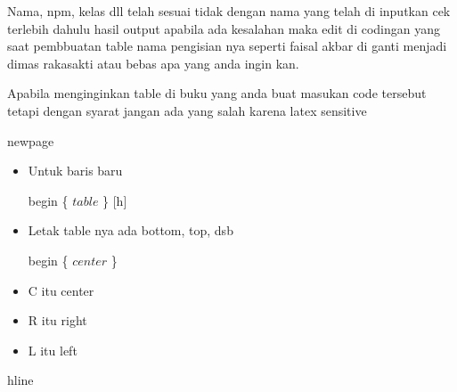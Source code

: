 Nama, npm, kelas dll telah sesuai tidak dengan nama yang telah di inputkan cek terlebih dahulu hasil output apabila ada kesalahan maka edit di codingan yang saat pembbuatan table nama pengisian nya seperti faisal akbar di ganti menjadi dimas rakasakti atau bebas apa yang anda ingin kan.\par


 Apabila menginginkan table di buku yang anda buat masukan code tersebut tetapi dengan syarat jangan ada yang salah karena latex sensitive\par


\noindent newpage\par

\begin{itemize}
	\item Untuk baris baru\par

begin \{ $table$ \} [h]\par

	\item Letak table nya ada bottom, top, dsb\par

begin \{ $center$ \} \par


	\item C itu center\par

	\item R itu right\par

	\item L itu left
\end{itemize}\par


\noindent hline\par

